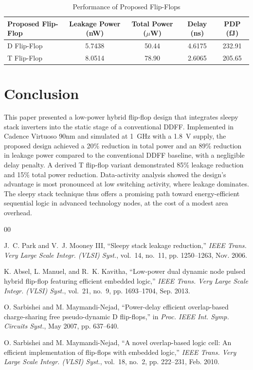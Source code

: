 \documentclass[conference]{IEEEtran}
\begin{document}
\begin{table}[H]
	\centering
	\caption{Performance of Proposed Flip-Flops}
	\label{tab:prop_ff}
	\begin{tabular}{lcccc}
		\hline
		Proposed Flip-Flop & Leakage Power (nW) & Total Power ($\mu$W) & Delay (ns) & PDP (fJ) \\
		\hline
		D Flip-Flop & 5.7438 & 50.44 & 4.6175 & 232.91 \\
		T Flip-Flop & 8.0514 & 78.90 & 2.6065 & 205.65 \\
		\hline
	\end{tabular}
\end{table}

\section{Conclusion}

This paper presented a low-power hybrid flip-flop design that integrates sleepy stack inverters into the static stage of a conventional DDFF. Implemented in Cadence Virtuoso 90nm and simulated at 1~GHz with a 1.8~V supply, the proposed design achieved a 20\% reduction in total power and an 89\% reduction in leakage power compared to the conventional DDFF baseline, with a negligible delay penalty. A derived T flip-flop variant demonstrated 85\% leakage reduction and 15\% total power reduction. Data-activity analysis showed the design's advantage is most pronounced at low switching activity, where leakage dominates. The sleepy stack technique thus offers a promising path toward energy-efficient sequential logic in advanced technology nodes, at the cost of a modest area overhead.

\begin{thebibliography}{00}

 J.~C. Park and V.~J. Mooney III, ``Sleepy stack leakage reduction,'' \textit{IEEE Trans. Very Large Scale Integr. (VLSI) Syst.}, vol.~14, no.~11, pp. 1250--1263, Nov. 2006.

 K. Absel, L. Manuel, and R.~K. Kavitha, ``Low-power dual dynamic node pulsed hybrid flip-flop featuring efficient embedded logic,'' \textit{IEEE Trans. Very Large Scale Integr. (VLSI) Syst.}, vol.~21, no.~9, pp. 1693--1704, Sep. 2013.

 O. Sarbishei and M. Maymandi-Nejad, ``Power-delay efficient overlap-based charge-sharing free pseudo-dynamic D flip-flops,'' in \textit{Proc. IEEE Int. Symp. Circuits Syst.}, May 2007, pp. 637--640.

 O. Sarbishei and M. Maymandi-Nejad, ``A novel overlap-based logic cell: An efficient implementation of flip-flops with embedded logic,'' \textit{IEEE Trans. Very Large Scale Integr. (VLSI) Syst.}, vol.~18, no.~2, pp. 222--231, Feb. 2010.

\end{thebibliography}
\end{document}
